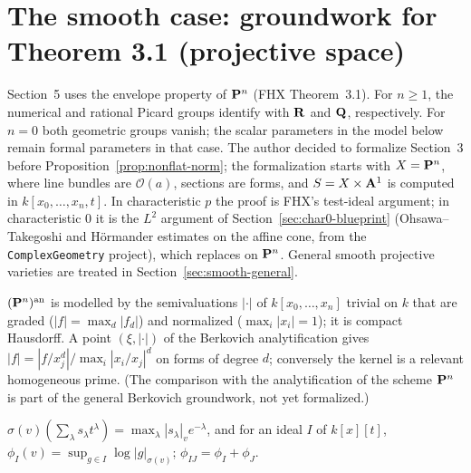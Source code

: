 \section{The smooth case: groundwork for Theorem 3.1 (projective space)}\label{sec:smooth-blueprint}

Section~5 uses the envelope property of $\mathbf{P}^n$ (FHX Theorem~3.1). For $n\ge1$, the numerical
and rational Picard groups identify with $\mathbf{R}$ and $\mathbf{Q}$, respectively. For $n=0$ both geometric
groups vanish; the scalar parameters in the model below remain formal parameters in that case.
The author decided to formalize
Section~3 before Proposition~\ref{prop:nonflat-norm}; the formalization starts with $X=\mathbf{P}^n$, where
line bundles are $\mathcal O(a)$, sections are forms, and $S=X\times\mathbf{A}^1$ is computed in
$k[x_0,\dots,x_n,t]$. In characteristic $p$ the proof is FHX's test-ideal argument; in characteristic
$0$ it is the $L^2$ argument of Section~\ref{sec:char0-blueprint} (Ohsawa--Takegoshi and H\"ormander estimates on the affine
cone, from the \texttt{ComplexGeometry} project), which replaces \cite[Theorem~5.20]{BJ22} on $\mathbf{P}^n$.
General smooth projective varieties are treated in Section~\ref{sec:smooth-general}.

\begin{definition}\label{def:pn-an}
\leanok
$(\mathbf{P}^n)^{\mathrm{an}}$ is modelled by the semivaluations $|\cdot|$ of $k[x_0,\dots,x_n]$ trivial on $k$ that are
graded ($|f|=\max_d|f_d|$) and normalized ($\max_i|x_i|=1$); it is compact Hausdorff. A point
$(\xi,|\cdot|)$ of the Berkovich analytification gives $|f|=|f/x_j^d|/\max_i|x_i/x_j|^d$ on forms of degree
$d$; conversely the kernel is a relevant homogeneous prime. (The comparison with the analytification of
the scheme $\mathbf{P}^n$ is part of the general Berkovich groundwork, not yet formalized.)
\end{definition}

\begin{definition}\label{def:pn-gauss}
\leanok
{}
$\sigma(v)(\sum_\lambda s_\lambda t^\lambda)=\max_\lambda|s_\lambda|_ve^{-\lambda}$, and for an ideal $I$ of
$k[x][t]$, $\phi_I(v)=\sup_{g\in I}\log|g|_{\sigma(v)}$; $\phi_{IJ}=\phi_I+\phi_J$.
\end{definition}

